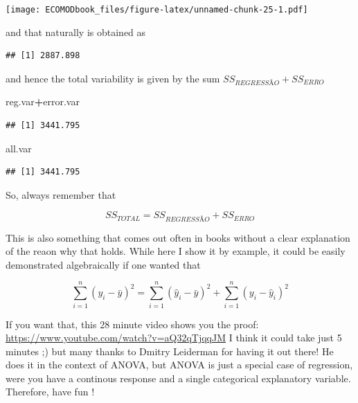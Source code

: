 \documentclass[
]{book}
\newenvironment{Shaded}{\begin{snugshade}}{\end{snugshade}}
\newcommand{\DecValTok}[1]{\textcolor[rgb]{0.00,0.00,0.81}{#1}}
\newcommand{\KeywordTok}[1]{\textcolor[rgb]{0.13,0.29,0.53}{\textbf{#1}}}
\newcommand{\NormalTok}[1]{#1}
\newcommand{\OperatorTok}[1]{\textcolor[rgb]{0.81,0.36,0.00}{\textbf{#1}}}
\begin{document}
\texttt{[image: ECOMODbook\_files/figure-latex/unnamed-chunk-25-1.pdf]}

and that naturally is obtained as

\begin{Shaded}
\end{Shaded}

\begin{verbatim}
## [1] 2887.898
\end{verbatim}

and hence the total variability is given by the sum \(SS_{REGRESSÃO}+SS_{ERRO}\)

\begin{Shaded}
\begin{Highlighting}[]
\NormalTok{reg.var}\OperatorTok{+}\NormalTok{error.var}
\end{Highlighting}
\end{Shaded}

\begin{verbatim}
## [1] 3441.795
\end{verbatim}

\begin{Shaded}
\begin{Highlighting}[]
\NormalTok{all.var}
\end{Highlighting}
\end{Shaded}

\begin{verbatim}
## [1] 3441.795
\end{verbatim}

So, always remember that

\[SS_{TOTAL}=SS_{REGRESSÃO}+SS_{ERRO}\]

This is also something that comes out often in books without a clear explanation of the reaon why that holds. While here I show it by example, it could be easily demonstrated algebraically if one wanted that

\[\sum_{i=1}^n (y_i- \bar y)^2=\sum_{i=1}^n (\hat y_i- \bar y)^2 + \sum_{i=1}^n (y_i- \hat y_i)^2\]

If you want that, this 28 minute video shows you the proof: \url{https://www.youtube.com/watch?v=aQ32qTjqqJM}
I think it could take just 5 minutes ;) but many thanks to Dmitry Leiderman for having it out there! He does it in the context of ANOVA, but ANOVA is just a special case of regression, were you have a continous response and a single categorical explanatory variable. Therefore, have fun !
\end{document}
